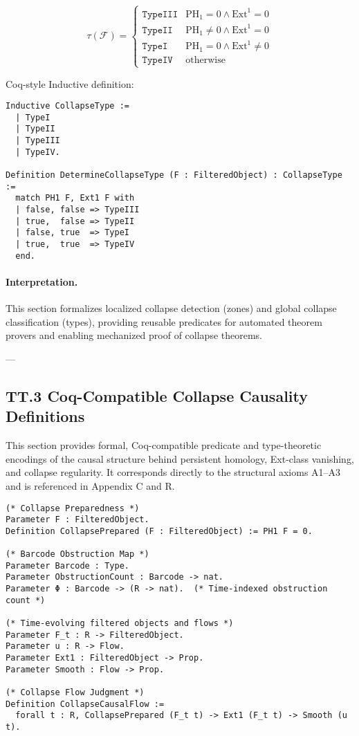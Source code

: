 \documentclass[11pt]{article}
\begin{document}
\[
\tau(\mathcal{F}) =
\begin{cases}
\texttt{TypeIII} & \mathrm{PH}_1 = 0 \land \mathrm{Ext}^1 = 0 \\
\texttt{TypeII} & \mathrm{PH}_1 \ne 0 \land \mathrm{Ext}^1 = 0 \\
\texttt{TypeI} & \mathrm{PH}_1 = 0 \land \mathrm{Ext}^1 \ne 0 \\
\texttt{TypeIV} & \text{otherwise}
\end{cases}
\]

Coq-style Inductive definition:

\begin{lstlisting}[language=Coq]
Inductive CollapseType :=
  | TypeI
  | TypeII
  | TypeIII
  | TypeIV.

Definition DetermineCollapseType (F : FilteredObject) : CollapseType :=
  match PH1 F, Ext1 F with
  | false, false => TypeIII
  | true,  false => TypeII
  | false, true  => TypeI
  | true,  true  => TypeIV
  end.
\end{lstlisting}

\paragraph{Interpretation.}
This section formalizes localized collapse detection (zones) and global collapse classification (types),  
providing reusable predicates for automated theorem provers and enabling mechanized proof of collapse theorems.

---

\subsection*{TT.3 Coq-Compatible Collapse Causality Definitions}

This section provides formal, Coq-compatible predicate and type-theoretic encodings  
of the causal structure behind persistent homology, Ext-class vanishing, and collapse regularity.  
It corresponds directly to the structural axioms A1–A3 and is referenced in Appendix C and R.

\begin{lstlisting}[language=Coq]
(* Collapse Preparedness *)
Parameter F : FilteredObject.
Definition CollapsePrepared (F : FilteredObject) := PH1 F = 0.

(* Barcode Obstruction Map *)
Parameter Barcode : Type.
Parameter ObstructionCount : Barcode -> nat.
Parameter Φ : Barcode -> (R -> nat).  (* Time-indexed obstruction count *)

(* Time-evolving filtered objects and flows *)
Parameter F_t : R -> FilteredObject.
Parameter u : R -> Flow.
Parameter Ext1 : FilteredObject -> Prop.
Parameter Smooth : Flow -> Prop.

(* Collapse Flow Judgment *)
Definition CollapseCausalFlow :=
  forall t : R, CollapsePrepared (F_t t) -> Ext1 (F_t t) -> Smooth (u t).
\end{lstlisting}
\end{document}
